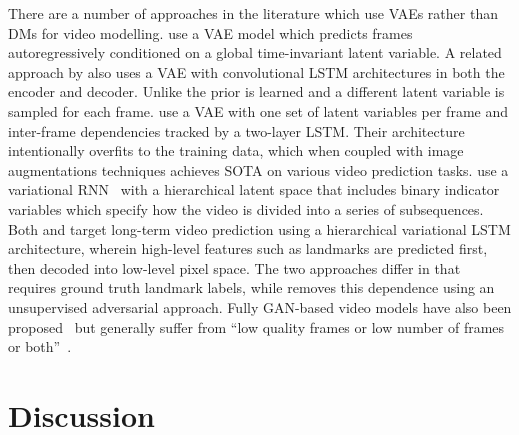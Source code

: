 There are a number of approaches in the literature which use VAEs rather than DMs for video modelling. \citet{babaeizadeh2017stochastic} use a VAE model which predicts frames autoregressively conditioned on a global time-invariant latent variable. A related approach by \citet{denton2018stochastic} also uses a VAE with convolutional LSTM architectures in both the encoder and decoder. Unlike \citet{babaeizadeh2017stochastic} the prior is learned and a different latent variable is sampled for each frame. \citet{babaeizadeh2021fitvid} use a VAE with one set of latent variables per frame and inter-frame dependencies tracked by a two-layer LSTM. Their architecture intentionally overfits to the training data, which when coupled with image augmentations techniques achieves SOTA on various video prediction tasks.  \citet{kim2019variational} use a variational RNN~\citep{chung2015recurrent} with a hierarchical latent space that includes binary indicator variables which specify how the video is divided into a series of subsequences. Both \citet{villegas2018hierarchical} and \citet{wichers2018learning} target long-term video prediction using a hierarchical variational LSTM architecture, wherein high-level features such as landmarks are predicted first, then decoded into low-level pixel space. The two approaches differ in that \citet{villegas2018hierarchical} requires ground truth landmark labels, while \cite{wichers2018learning} removes this dependence using an unsupervised adversarial approach. Fully GAN-based video models have also been proposed~\citep{aldausari2022video,clark2019adversarial} but generally suffer from ``low quality frames or low number of frames or both''~\citep{aldausari2022video}.

\section{Discussion}

